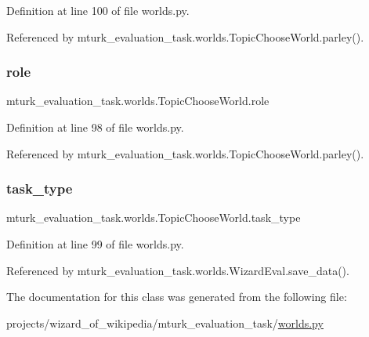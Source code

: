 Definition at line 100 of file worlds.\+py.



Referenced by mturk\+\_\+evaluation\+\_\+task.\+worlds.\+Topic\+Choose\+World.\+parley().

\mbox{\label{classmturk__evaluation__task_1_1worlds_1_1TopicChooseWorld_ae4b2f15304f19e802dad4191efb79184}} 
\subsubsection{\texorpdfstring{role}{role}}
{\footnotesize\ttfamily mturk\+\_\+evaluation\+\_\+task.\+worlds.\+Topic\+Choose\+World.\+role}



Definition at line 98 of file worlds.\+py.



Referenced by mturk\+\_\+evaluation\+\_\+task.\+worlds.\+Topic\+Choose\+World.\+parley().

\mbox{\label{classmturk__evaluation__task_1_1worlds_1_1TopicChooseWorld_abb9412f28859e47ab87dd4790644804a}} 
\subsubsection{\texorpdfstring{task\+\_\+type}{task\_type}}
{\footnotesize\ttfamily mturk\+\_\+evaluation\+\_\+task.\+worlds.\+Topic\+Choose\+World.\+task\+\_\+type}



Definition at line 99 of file worlds.\+py.



Referenced by mturk\+\_\+evaluation\+\_\+task.\+worlds.\+Wizard\+Eval.\+save\+\_\+data().



The documentation for this class was generated from the following file\+:\begin{DoxyCompactItemize}
\item 
projects/wizard\+\_\+of\+\_\+wikipedia/mturk\+\_\+evaluation\+\_\+task/\hyperlink{projects_2wizard__of__wikipedia_2mturk__evaluation__task_2worlds_8py}{worlds.\+py}\end{DoxyCompactItemize}
